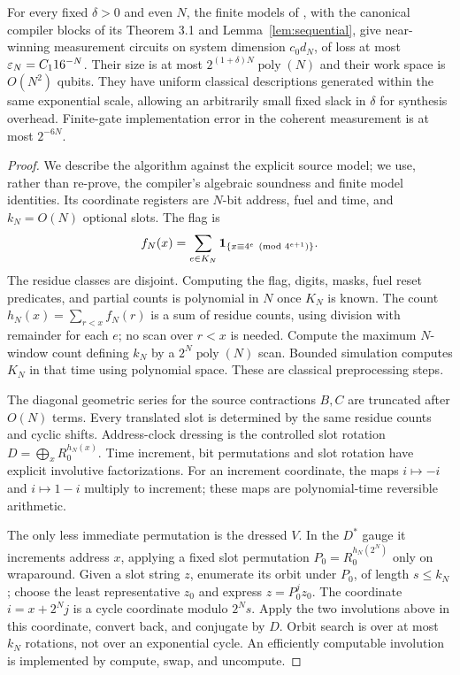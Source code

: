 \begin{proposition}\label{prop:circuits}
For every fixed $\delta>0$ and even $N$, the finite models of
\cite[Theorem 7.1]{unprice}, with the canonical compiler blocks of its
Theorem 3.1 and Lemma~\ref{lem:sequential}, give near-winning
measurement circuits on system dimension $c_0d_N$, of loss at most
$\varepsilon_N=C_1 16^{-N}$. Their size is at most
$2^{(1+\delta)N}\operatorname{poly}(N)$ and their work space is
$O(N^2)$ qubits. They have uniform classical descriptions generated
within the same exponential scale, allowing an arbitrarily small
fixed slack in $\delta$ for synthesis overhead. Finite-gate
implementation error in the coherent measurement is at most
$2^{-6N}$.
\end{proposition}
\begin{proof}
We describe the algorithm against the explicit source model; we use,
rather than re-prove, the compiler's algebraic soundness and finite
model identities. Its coordinate registers are $N$-bit address, fuel
and time, and $k_N=O(N)$ optional slots. The flag is
\[
 f_N(x)=\sum_{e\in K_N}\mathbf 1_{\{x\equiv4^e\pmod{4^{e+1}}\}}.
\]
The residue classes are disjoint. Computing the flag, digits, masks,
fuel reset predicates, and partial counts is polynomial in $N$ once
$K_N$ is known. The count $h_N(x)=\sum_{r<x}f_N(r)$ is a sum of
residue counts, using division with remainder for each $e$; no scan
over $r<x$ is needed. Compute the maximum $N$-window count defining
$k_N$ by a $2^N\operatorname{poly}(N)$ scan. Bounded simulation
computes $K_N$ in that time using polynomial space. These are
classical preprocessing steps.

The diagonal geometric series for the source contractions $B,C$
are truncated after $O(N)$ terms. Every translated slot is determined
by the same residue counts and cyclic shifts. Address-clock dressing
is the controlled slot rotation $D=\bigoplus_x R_0^{h_N(x)}$.
Time increment, bit permutations and slot rotation have explicit
involutive factorizations. For an increment coordinate, the maps
$i\mapsto-i$ and $i\mapsto1-i$ multiply to increment; these maps are
polynomial-time reversible arithmetic.

The only less immediate permutation is the dressed $V$. In the $D^*$
gauge it increments address $x$, applying a fixed slot permutation
$P_0=R_0^{h_N(2^N)}$ only on wraparound. Given a slot string $z$,
enumerate its orbit under $P_0$, of length $s\leq k_N$; choose the
least representative $z_0$ and express $z=P_0^jz_0$. The coordinate
$i=x+2^Nj$ is a cycle coordinate modulo $2^Ns$. Apply the two
involutions above in this coordinate, convert back, and conjugate by
$D$. Orbit search is over at most $k_N$ rotations, not over an
exponential cycle. An efficiently computable involution is implemented
by compute, swap, and uncompute.


\end{proof}
